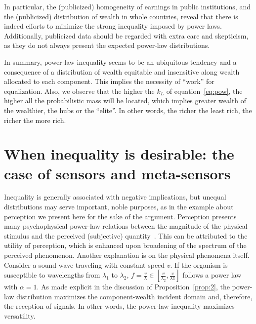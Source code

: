 \documentclass[10pt,letterpaper]{article}
\begin{document}
In particular, the (publicized)
homogeneity of earnings in public institutions,
and the (publicized) distribution of wealth in whole countries,
reveal that there is indeed efforts to minimize
the strong inequality imposed by power laws.
Additionally, publicized data should be regarded with
extra care and skepticism, as they do not always present the
expected power-law distributions.

In summary, power-law inequality seems to be an ubiquitous tendency
and a consequence of a distribution of wealth equitable and insensitive along wealth allocated to each component.
This implies the necessity of ``work'' for equalization.
Also, we observe that the higher the $k_L$ of equation~\ref{eq:pow}, the higher all the probabilistic mass will be located, which
implies greater wealth of the wealthier, the hubs or the ``elite''.
In other words, the richer the least rich,
the richer the more rich.


\section{When inequality is desirable: the case of sensors and meta-sensors}\label{sec:meta}

Inequality is generally associated with negative implications, but unequal distributions may serve important, noble purposes, as in the example about perception we present here for the sake of the argument.  
Perception presents many psychophysical power-law relations between the magnitude of the physical stimulus and the perceived (subjective) quantity~\cite{pbook}. This can be attributed to the utility of perception, which is enhanced upon broadening of the spectrum of the perceived phenomenon. Another explanation is on the physical phenomena itself. Consider a sound wave traveling with constant speed $v$.
If the organism is susceptible to wavelengths from $\lambda_1$
to $\lambda_2$, $f=\frac{v}{\lambda} \in [\frac{v}{\lambda_2},\frac{v}{\lambda1}]$ follows a power law with $\alpha=1$. As made explicit in the discussion of Proposition~\ref{prop:2}, the power-law distribution
maximizes the component-wealth incident domain and,
therefore, the reception of signals.
In other words, the power-law inequality
maximizes versatility.
\end{document}
